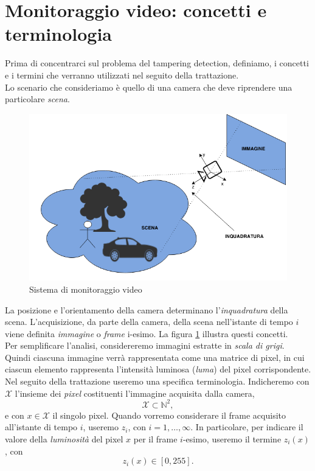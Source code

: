 \section{Monitoraggio video: concetti e terminologia}
Prima di concentrarci sul problema del tampering detection, definiamo, i concetti e i termini che verranno utilizzati nel seguito della trattazione.\\
Lo scenario che consideriamo \`e quello di una camera che deve riprendere una particolare \textit{\gls{scena}}.
\begin{figure}
	\centering
	\includegraphics[width=12cm]{./pictures/videoMonitoring}
	\caption{Sistema di monitoraggio video}
	\label{fig:videoMonitoring}
\end{figure}
\noindent 
La posizione e l'orientamento della camera determinano l'\textit{\gls{inquadratura}} della scena.
L'acquisizione, da parte della camera, della scena nell'istante di tempo $i$ viene definita \textit{immagine} o \textit{frame} i-esimo.
La figura \ref{fig:videoMonitoring} illustra questi concetti.\\
Per semplificare l'analisi, considereremo immagini estratte in \textit{scala di grigi}.
Quindi ciascuna immagine verr\`a rappresentata come una matrice di pixel, in cui ciascun elemento rappresenta l'intensit\`a luminosa (\textit{luma}) del pixel corrispondente.\\
Nel seguito della trattazione useremo una specifica terminologia.
Indicheremo con $\mathcal{X}$ l'insieme dei \textit{pixel} costituenti l'immagine acquisita dalla camera,
\[ \mathcal{X} \subset \mathbb{N}^2, \]
e con $x \in \mathcal{X}$ il singolo pixel.
Quando vorremo considerare il frame acquisito all'istante di tempo $i$, useremo $z_i$, con $i=1,\dots , \infty$. 
In particolare, per indicare il valore della \textit{luminosit\`a} del pixel $x$ per il frame $i$-esimo, useremo il termine $z_i(x)$, con 
\[ z_i(x) \in [0, 255]. \]

